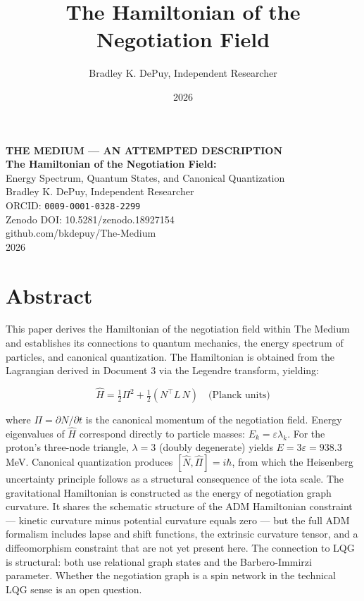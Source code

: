 \documentclass[11pt,letterpaper]{article}
\author{Bradley K. DePuy, Independent Researcher}
\date{2026}
\title{The Hamiltonian of the Negotiation Field}
\begin{document}
\pagestyle{plain}
\begin{titlepage}
\vspace*{3cm}
\begin{center}
  {\large\bfseries THE MEDIUM --- AN ATTEMPTED DESCRIPTION}\\[1em]
  {\LARGE\bfseries The Hamiltonian of the Negotiation Field:}\\[0.4em]
  {\large Energy Spectrum, Quantum States, and Canonical Quantization}\\[2em]
  {\normalsize Bradley K. DePuy, Independent Researcher}\\[0.4em]
  {\normalsize ORCID: \texttt{0009-0001-0328-2299}}\\[0.4em]
  {\normalsize Zenodo DOI: 10.5281/zenodo.18927154}\\[0.4em]
  {\normalsize github.com/bkdepuy/The-Medium}\\[0.4em]
  {\normalsize 2026}
\end{center}
\end{titlepage}
\pagestyle{body}

\section{Abstract}
\label{sec:org64e774a}

This paper derives the Hamiltonian of the negotiation field within The Medium and establishes its connections to quantum mechanics, the energy spectrum of particles, and canonical quantization. The Hamiltonian is obtained from the Lagrangian derived in Document 3 via the Legendre transform, yielding:

\begin{equation}
\hat{H} = \tfrac{1}{2}\Pi^2 + \tfrac{1}{2}(N^\top L\, N) \quad \text{(Planck units)}
\end{equation}

where \(\Pi = \partial N/\partial t\) is the canonical momentum of the negotiation field. Energy eigenvalues of \(\hat{H}\) correspond directly to particle masses: \(E_k = \varepsilon \lambda_k\). For the proton's three-node triangle, \(\lambda = 3\) (doubly degenerate) yields \(E = 3\varepsilon = 938.3\) MeV. Canonical quantization produces \([\hat{N}, \hat{\Pi}] = i\hbar\), from which the Heisenberg uncertainty principle follows as a structural consequence of the iota scale. The gravitational Hamiltonian is constructed as the energy of negotiation graph curvature. It shares the schematic structure of the ADM Hamiltonian constraint --- kinetic curvature minus potential curvature equals zero --- but the full ADM formalism includes lapse and shift functions, the extrinsic curvature tensor, and a diffeomorphism constraint that are not yet present here. The connection to LQG is structural: both use relational graph states and the Barbero-Immirzi parameter. Whether the negotiation graph is a spin network in the technical LQG sense is an open question.
\end{document}
